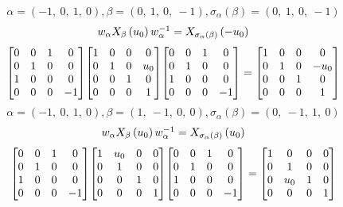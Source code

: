 \documentclass[11pt]{article}
\theoremstyle{definition}
\begin{document}
\[
\alpha = \left( -1, \  0, \  1, \  0\right), \beta = \left( 0, \  1, \  0, \  -1\right), \sigma_{\alpha}(\beta) = \left( 0, \  1, \  0, \  -1\right)
\]
\[
\scaletoalign{\textwidth}{w_{\alpha} X_{\beta}\left(u_{0}\right) w_{\alpha}^{-1} = X_{\sigma_{\alpha}\left(\beta\right)}\left(- u_{0}\right)}
\]
\[
\scaletoalign{\textwidth}{{\left[\begin{matrix}0 & 0 & 1 & 0\\0 & 1 & 0 & 0\\1 & 0 & 0 & 0\\0 & 0 & 0 & -1\end{matrix}\right]} {\left[\begin{matrix}1 & 0 & 0 & 0\\0 & 1 & 0 & u_{0}\\0 & 0 & 1 & 0\\0 & 0 & 0 & 1\end{matrix}\right]} {\left[\begin{matrix}0 & 0 & 1 & 0\\0 & 1 & 0 & 0\\1 & 0 & 0 & 0\\0 & 0 & 0 & -1\end{matrix}\right]} = {\left[\begin{matrix}1 & 0 & 0 & 0\\0 & 1 & 0 & - u_{0}\\0 & 0 & 1 & 0\\0 & 0 & 0 & 1\end{matrix}\right]}}
\]
\[
\alpha = \left( -1, \  0, \  1, \  0\right), \beta = \left( 1, \  -1, \  0, \  0\right), \sigma_{\alpha}(\beta) = \left( 0, \  -1, \  1, \  0\right)
\]
\[
\scaletoalign{\textwidth}{w_{\alpha} X_{\beta}\left(u_{0}\right) w_{\alpha}^{-1} = X_{\sigma_{\alpha}\left(\beta\right)}\left(u_{0}\right)}
\]
\[
\scaletoalign{\textwidth}{{\left[\begin{matrix}0 & 0 & 1 & 0\\0 & 1 & 0 & 0\\1 & 0 & 0 & 0\\0 & 0 & 0 & -1\end{matrix}\right]} {\left[\begin{matrix}1 & u_{0} & 0 & 0\\0 & 1 & 0 & 0\\0 & 0 & 1 & 0\\0 & 0 & 0 & 1\end{matrix}\right]} {\left[\begin{matrix}0 & 0 & 1 & 0\\0 & 1 & 0 & 0\\1 & 0 & 0 & 0\\0 & 0 & 0 & -1\end{matrix}\right]} = {\left[\begin{matrix}1 & 0 & 0 & 0\\0 & 1 & 0 & 0\\0 & u_{0} & 1 & 0\\0 & 0 & 0 & 1\end{matrix}\right]}}
\]
\end{document}
